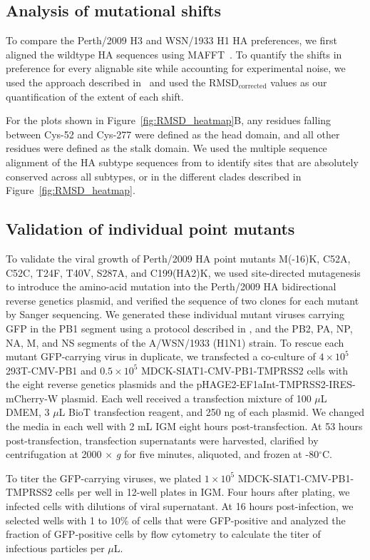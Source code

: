 \documentclass[9pt,twoside,lineno]{pnas-new}
\begin{document}
\subsection*{Analysis of mutational shifts}
To compare the Perth/2009 H3 and WSN/1933 H1 HA preferences, we first aligned the wildtype HA sequences using MAFFT~\cite{katoh2013mafft}.
To quantify the shifts in preference for every alignable site while accounting for experimental noise, we used the approach described in~\cite{haddox2018mapping} and used the RMSD$_{\text{corrected}}$ values as our quantification of the extent of each shift.

For the plots shown in Figure~\ref{fig:RMSD_heatmap}B, any residues falling between Cys-52 and Cys-277 were defined as the head domain, and all other residues were defined as the stalk domain.
We used the multiple sequence alignment of the HA subtype sequences from \cite{doud2018quantifying} to identify sites that are absolutely conserved across all subtypes, or in the different clades described in Figure~\ref{fig:RMSD_heatmap}.

\subsection*{Validation of individual point mutants}
To validate the viral growth of Perth/2009 HA point mutants M(-16)K, C52A, C52C, T24F, T40V, S287A, and C199(HA2)K, we used site-directed mutagenesis to introduce the amino-acid mutation into the Perth/2009 HA bidirectional reverse genetics plasmid, and verified the sequence of two clones for each mutant by Sanger sequencing.
We generated these individual mutant viruses carrying GFP in the PB1 segment using a protocol described in \cite{bloom2010permissive,hooper2013mutant}, and the PB2, PA, NP, NA, M, and NS segments of the A/WSN/1933 (H1N1) strain.
To rescue each mutant GFP-carrying virus in duplicate, we transfected a co-culture of $4 \times 10^5$ 293T-CMV-PB1 and $0.5 \times 10^5$ MDCK-SIAT1-CMV-PB1-TMPRSS2 cells with the eight reverse genetics plasmids and the pHAGE2-EF1aInt-TMPRSS2-IRES-mCherry-W plasmid.
Each well received a transfection mixture of 100 $\mu$L DMEM, 3 $\mu$L BioT transfection reagent, and 250 ng of each plasmid.
We changed the media in each well with 2 mL IGM eight hours post-transfection.
At 53 hours post-transfection, transfection supernatants were harvested, clarified by centrifugation at 2000 $\times$ \textit{g} for five minutes, aliquoted, and frozen at -80$^\circ$C.

To titer the GFP-carrying viruses, we plated $1 \times 10^5$ MDCK-SIAT1-CMV-PB1-TMPRSS2 cells per well in 12-well plates in IGM.
Four hours after plating, we infected cells with dilutions of viral supernatant.
At 16 hours post-infection, we selected wells with 1 to 10\% of cells that were GFP-positive and analyzed the fraction of GFP-positive cells by flow cytometry to calculate the titer of infectious particles per $\mu$L. 
\end{document}
